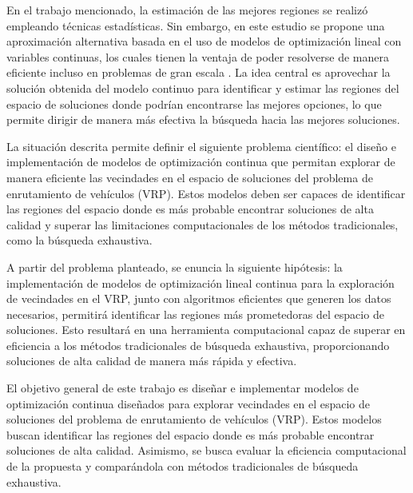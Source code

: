 \documentclass[12pt]{article}
\begin{document}
En el trabajo mencionado, la estimación de las mejores regiones se realizó empleando técnicas estadísticas. Sin embargo, en este estudio se propone una aproximación alternativa basada en el uso de modelos de optimización lineal con variables continuas, los cuales tienen la ventaja de poder resolverse de manera eficiente incluso en problemas de gran escala \cite{ref24}. La idea central es aprovechar la solución obtenida del modelo continuo para identificar y estimar las regiones del espacio de soluciones donde podrían encontrarse las mejores opciones, lo que permite dirigir de manera más efectiva la búsqueda hacia las mejores soluciones.

La situación descrita permite definir el siguiente problema científico: el diseño e implementación de modelos de optimización continua que permitan explorar de manera eficiente las vecindades en el espacio de soluciones del problema de enrutamiento de vehículos (VRP). Estos modelos deben ser capaces de identificar las regiones del espacio donde es más probable encontrar soluciones de alta calidad y superar las limitaciones computacionales de los métodos tradicionales, como la búsqueda exhaustiva.

A partir del problema planteado, se enuncia la siguiente hipótesis: la implementación de modelos de optimización lineal continua para la exploración de vecindades en el VRP, junto con algoritmos eficientes que generen los datos necesarios, permitirá identificar las regiones más prometedoras del espacio de soluciones. Esto resultará en una herramienta computacional capaz de superar en eficiencia a los métodos tradicionales de búsqueda exhaustiva, proporcionando soluciones de alta calidad de manera más rápida y efectiva.

El objetivo general de este trabajo es diseñar e implementar modelos de optimización continua diseñados para explorar vecindades en el espacio de soluciones del problema de enrutamiento de vehículos (VRP). Estos modelos buscan identificar las regiones del espacio donde es más probable encontrar soluciones de alta calidad. Asimismo, se busca evaluar la eficiencia computacional de la propuesta y comparándola con métodos tradicionales de búsqueda exhaustiva.
\end{document}
